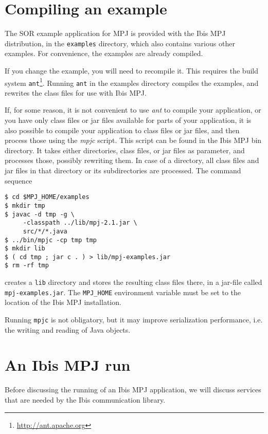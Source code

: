 \documentclass[a4paper,10pt]{article}
\begin{document}
\section{Compiling an example}

The SOR example application for MPJ is
provided with the Ibis MPJ distribution, in the \texttt{examples} directory,
which also contains various other examples.
For convenience, the examples are already compiled.

If you change the example, you will need to recompile it. This
requires the build system \texttt{ant}\footnote{\url{http://ant.apache.org}}.
Running \texttt{ant} in the examples directory compiles the examples,
and rewrites the class files for use with Ibis MPJ.

If, for some reason, it is not convenient to use \emph{ant} to compile
your application, or you have only class files or jar files available
for parts of your application, it is also possible to compile
your application to class files or jar files, and then process those
using the \emph{mpjc} script. This script can be found in the Ibis MPJ
bin directory. It takes either directories, class files, or jar files
as parameter, and processes those, possibly rewriting them. In case
of a directory, all class files and jar files in that directory or
its subdirectories are processed.  The command sequence

\begin{verbatim}
$ cd $MPJ_HOME/examples
$ mkdir tmp
$ javac -d tmp -g \
     -classpath ../lib/mpj-2.1.jar \
     src/*/*.java
$ ../bin/mpjc -cp tmp tmp
$ mkdir lib
$ ( cd tmp ; jar c . ) > lib/mpj-examples.jar
$ rm -rf tmp
\end{verbatim}

creates a \texttt{lib} directory and stores the resulting class files there,
in a jar-file called \texttt{mpj-examples.jar}.
The \texttt{MPJ\_HOME} environment variable must be set to the location of
the Ibis MPJ installation.

Running \texttt{mpjc} is not obligatory, but it may improve 
serialization performance, i.e. the writing and reading of Java objects.

\section{An Ibis MPJ run}

Before discussing
the running of an Ibis MPJ application, we will discuss services that are
needed by the Ibis communication library.
\end{document}
